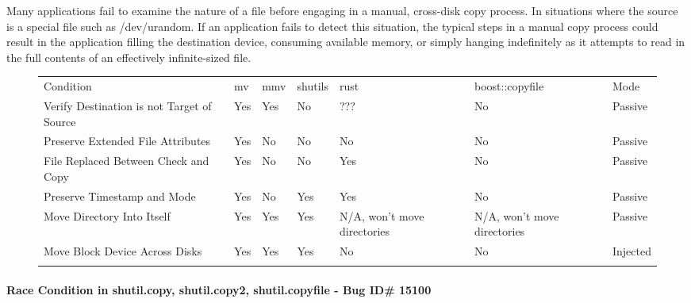         Many applications fail to examine the nature of a file before engaging in a manual, cross-disk copy process.  In
        situations where the source is a special file such as /dev/urandom.  If an application fails to detect this
        situation, the typical steps in a manual copy process could result in the application filling the destination
        device, consuming available memory, or simply hanging indefinitely as it attempts to read in the full contents
        of an effectively infinite-sized file.

\begin{figure*}[t]
        \scriptsize{}
        \begin{tabular}{l l l l l l | l}
        \toprule{}
          Condition & mv & mmv & shutils & rust & boost::copyfile & Mode\\
          Verify Destination is not Target of Source & Yes & Yes & No & ??? & No & Passive\\
          Preserve Extended File Attributes & Yes & No & No & No & No & Passive\\
          File Replaced Between Check and Copy & Yes & No & No & Yes & No & Passive\\
          Preserve Timestamp and Mode & Yes & No & Yes & Yes & No & Passive\\
          Move Directory Into Itself & Yes & Yes & Yes & N/A, won't move directories & N/A, won't move directories & Passive\\
          Move Block Device Across Disks & Yes & Yes & Yes & No & No & Injected\\
        \bottomrule{}
        \end{tabular}
\end{figure*}







    \paragraph{Race Condition in shutil.copy, shutil.copy2, shutil.copyfile - Bug ID\# 15100}
      
